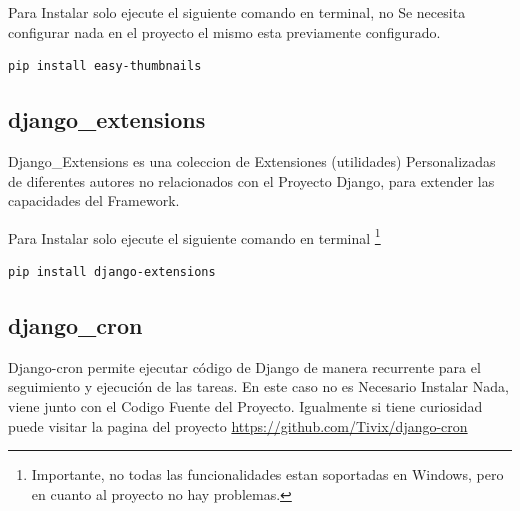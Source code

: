 Para Instalar solo ejecute el siguiente comando en terminal, no Se necesita
configurar nada en el proyecto el mismo esta previamente configurado.

\begin{lstlisting}[style=consola]
    pip install easy-thumbnails
\end{lstlisting}
\vspace{0.1cm}

\subsection{django\_extensions}

Django\_Extensions es una coleccion de Extensiones (utilidades) Personalizadas de
diferentes autores no relacionados con el Proyecto Django, para extender las
capacidades del Framework.

Para Instalar solo ejecute el siguiente comando en terminal \footnote{Importante, no todas las funcionalidades
estan soportadas en Windows, pero en cuanto al proyecto no hay problemas.}

\begin{lstlisting}[style=consola]
     pip install django-extensions
\end{lstlisting}
\vspace{0.1cm}


\subsection{django\_cron}

Django-cron permite ejecutar código de Django de manera recurrente para el
seguimiento y ejecución de las tareas. En este caso no es Necesario Instalar
Nada, viene junto con el Codigo Fuente del Proyecto. Igualmente si tiene curiosidad
puede visitar la pagina del proyecto \url{https://github.com/Tivix/django-cron}




